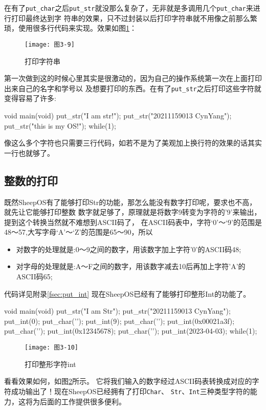 在有了\texttt{put\_char}之后\texttt{put\_str}就没那么复杂了，无非就是多调用几个\texttt{put\_char}来进行打印最终达到字
符串的效果，只不过封装以后打印字符串就不用像之前那么繁琐，使用很多行代码来实现。效果如图\ref{fig:print_str}：

\begin{figure}[H]
  \centering
  \texttt{[image: 图3-9]}
  \caption{打印字符串}
  \label{fig:print_str}
\end{figure}

第一次做到这的时候心里其实是很激动的，因为自己的操作系统第一次在上面打印出来自己的名字和学号以
及想要打印的东西。在有了\texttt{put\_str}之后打印这些字符就变得容易了许多:

\begin{codeblock}
\begin{ccode}
void main(void)
{
   put_str("I am str!\n");
   put_str("20211159013 CynYang\n");
   put_str("this is my OS!\n");
   while(1);
}
\end{ccode}  
\end{codeblock}

像这么多个字符也只需要三行代码，如若不是为了美观加上换行符的效果的话其实一行也就够了。

\subsection{整数的打印}
\label{subsec:int}
既然SheepOS有了能够打印Str的功能，那怎么能没有数字打印呢，要求也不高，就先让它能够打印整数
数字就足够了，原理就是将数字9转变为字符的'9'来输出，提到这个转换当然就不难想到ASCII码了，
在ASCII码表中，字符‘0’～‘9’的范围是48～57,大写字母‘A’～‘Z’的范围是65～90，所以
\begin{itemize}
\item 对数字的处理就是:0～9之间的数字，用该数字加上字符'0'的ASCII码48;
\item 对字母的处理就是:A～F之间的数字，用该数字减去10后再加上字符'A'的ASCII码65;
\end{itemize}
代码详见附录\ref{fsec:put_int}
现在SheepOS已经有了能够打印整形Int的功能了。

\begin{ccode}
void main(void)
{
   put_str("I am Str\n");
   put_str("20211159013 CynYang\n");
   put_int(0);
   put_char('\n');
   put_int(9);
   put_char('\n');
   put_int(0x00021a3f);
   put_char('\n');
   put_int(0x12345678);
   put_char('\n');
   put_int(2023-04-03);
   while(1);
}
\end{ccode}

\begin{figure}[H]
  \centering
  \texttt{[image: 图3-10]}
  \caption{打印整形字符int}
  \label{fig:print_int}
\end{figure}
看看效果如何，如图\ref{fig:print_int}所示。
它将我们输入的数字经过ASCII码表转换成对应的字符成功输出了！现在SheepOS已经拥有了打印\texttt{Char}、
\texttt{Str}、\texttt{Int}三种类型字符的能力，这将为后面的工作提供很多便利。

